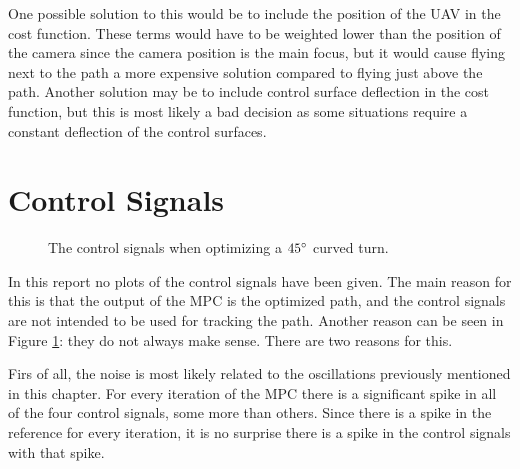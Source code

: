 One possible solution to this would be to include the position of the UAV in the cost function. These terms would have to be weighted lower than the position of the camera since the camera position is the main focus, but it would cause flying next to the path a more expensive solution compared to flying just above the path. Another solution may be to include control surface deflection in the cost function, but this is most likely a bad decision as some situations require a constant deflection of the control surfaces.


\section{Control Signals}

\begin{figure}[]
	\centering
	\caption{The control signals when optimizing a $45\degree$ curved turn.}
	\label{fig:control_signals}
\end{figure}

In this report no plots of the control signals have been given. The main reason for this is that the output of the MPC is the optimized path, and the control signals are not intended to be used for tracking the path. Another reason can be seen in Figure \ref{fig:control_signals}: they do not always make sense. There are two reasons for this.

Firs of all, the noise is most likely related to the oscillations previously mentioned in this chapter. For every iteration of the MPC there is a significant spike in all of the four control signals, some more than others. Since there is a spike in the reference for every iteration, it is no surprise there is a spike in the control signals with that spike.

